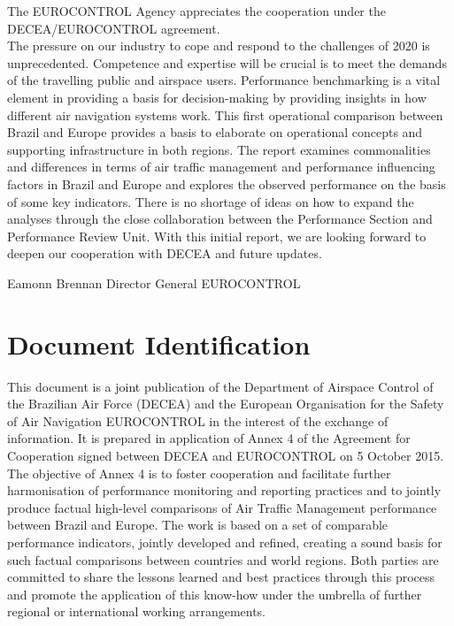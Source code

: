 \documentclass[
]{book}
\begin{document}
The EUROCONTROL Agency appreciates the cooperation under the DECEA/EUROCONTROL agreement.\\
The pressure on our industry to cope and respond to the challenges of 2020 is unprecedented.
Competence and expertise will be crucial is to meet the demands of the travelling public and airspace users.
Performance benchmarking is a vital element in providing a basis for decision-making by providing insights in how different air navigation systems work.
This first operational comparison between Brazil and Europe provides a basis to elaborate on operational concepts and supporting infrastructure in both regions.
The report examines commonalities and differences in terms of air traffic management and performance influencing factors in Brazil and Europe and explores the observed performance on the basis of some key indicators.
There is no shortage of ideas on how to expand the analyses through the close collaboration between the Performance Section and Performance Review Unit.
With this initial report, we are looking forward to deepen our cooperation with DECEA and future updates.

Eamonn Brennan
Director General EUROCONTROL

\hypertarget{document-identification}{%
\chapter*{Document Identification}\label{document-identification}}

This document is a joint publication of the Department of Airspace Control of the Brazilian Air Force (DECEA) and the European Organisation for the Safety of Air Navigation EUROCONTROL in the interest of the exchange of information.
It is prepared in application of Annex 4 of the Agreement for Cooperation signed between DECEA and EUROCONTROL on 5 October 2015.
The objective of Annex 4 is to foster cooperation and facilitate further harmonisation of performance monitoring and reporting practices and to jointly produce factual high-level comparisons of Air Traffic Management performance between Brazil and Europe.
The work is based on a set of comparable performance indicators, jointly developed and refined, creating a sound basis for such factual comparisons between countries and world regions.
Both parties are committed to share the lessons learned and best practices through this process and promote the application of this know-how under the umbrella of further regional or international working arrangements.
\end{document}
